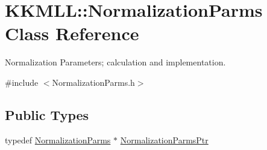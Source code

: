 \hypertarget{class_k_k_m_l_l_1_1_normalization_parms}{}\section{K\+K\+M\+LL\+:\+:Normalization\+Parms Class Reference}
\label{class_k_k_m_l_l_1_1_normalization_parms}


Normalization Parameters; calculation and implementation.  




{\ttfamily \#include $<$Normalization\+Parms.\+h$>$}

\subsection*{Public Types}
\begin{DoxyCompactItemize}
\item 
typedef \hyperlink{class_k_k_m_l_l_1_1_normalization_parms}{Normalization\+Parms} $\ast$ \hyperlink{class_k_k_m_l_l_1_1_normalization_parms_ab326a259979eaf51a6396d19430b1259}{Normalization\+Parms\+Ptr}
\end{DoxyCompactItemize}
